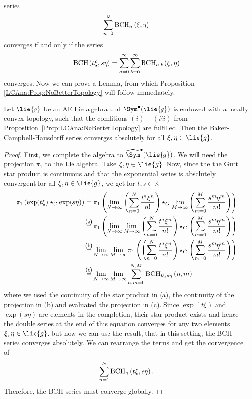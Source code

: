 series
\begin{equation*}
	\sum\limits_{n = 0}^N
	\mathrm{BCH}_{n}\left(\xi, \eta\right)
\end{equation*}
converges if and only if the series
\begin{equation*}
	\mathrm{BCH}\left(t \xi, s \eta\right)
	=
	\sum\limits_{a = 0}^{\infty}
	\sum\limits_{b = 0}^{\infty}
	\mathrm{BCH}_{a, b}\left(\xi, \eta\right)
\end{equation*}
converges. Now we can prove a Lemma, from which Proposition 
\ref{LCAna:Prop:NoBetterTopology} will follow immediately.
\begin{lemma}
	Let $\lie{g}$ be an AE Lie algebra and $\Sym^{\bullet}(\lie{g})$ is 
	endowed with a locally convex topology, such that the conditions $(i) - 
	(iii)$ from Proposition~\ref{Prop:LCAna:NoBetterTopology} are fulfilled. 
	Then the Baker-Campbell-Hausdorff series converges absolutely for all 
	$\xi, \eta \in \lie{g}$.
\end{lemma}
\begin{proof}
	First, we complete the algebra to $\widehat{\Sym}^{\bullet}(\lie{g})$.
	We will need the projection $\pi_1$ to the Lie algebra. Take 
	$\xi, \eta \in 	\lie{g}$. Now, since the the Gutt star product is 
	continuous and that the exponential series is absolutely convergent for 
	all $\xi, \eta \in \lie{g}$, we get for $t, s \in \mathbb{K}$
	\begin{align*}
		\pi_1 \left( \exp(t \xi) \star_G \exp(s \eta) \right)
		& =
		\pi_1
		\left(
			\lim_{N \rightarrow \infty}
			\left(
				\sum\limits_{n=0}^N
				\frac{t^n \xi^n}{n!}
			\right)
			\star_G
			\lim_{M \rightarrow \infty}
			\left(
				\sum\limits_{m=0}^M
				\frac{s^m \eta^m}{m!}
			\right)
		\right)
		\\
		& \ot{(a)}{=}
		\pi_1
		\left(
			\lim_{N \rightarrow \infty}
			\lim_{M \rightarrow \infty}
			\left(
				\sum\limits_{n=0}^N
				\frac{t^n \xi^n}{n!}
			\right)
			\star_G
			\left(
				\sum\limits_{m=0}^M
				\frac{s^m \eta^m}{m!}
			\right)
		\right)
		\\
		& \ot{(b)}{=}
		\lim_{N \rightarrow \infty}
		\lim_{M \rightarrow \infty}
		\pi_1
		\left(	
			\left(
				\sum\limits_{n=0}^N
				\frac{t^n \xi^n}{n!}
			\right)
			\star_G
			\left(
				\sum\limits_{m=0}^M
				\frac{s^m \eta^m}{m!}
			\right)
		\right)
		\\
		& \ot{(c)}{=}
		\lim_{N \rightarrow \infty}
		\lim_{M \rightarrow \infty}
		\sum\limits_{n,m=0}^{N, M}
		\bchparts{t \xi}{s \eta}{n}{m}
	\end{align*}
	where we used the continuity of the star product in (a), the continuity of 
	the projection in (b) and evaluated the projection in (c). Since 
	$\exp(t \xi)$ and $\exp(s \eta)$ are elements in the completion, their 
	star product exists and hence the double series at the end of this 
	equation converges for any two elements $\xi, \eta \in \lie{g}$. but now 
	we can use the result, that in this setting, the BCH series converges 
	absolutely. We can rearrange the terms and get the convergence of
	\begin{equation*}
		\sum\limits_{n = 1}^N
		\mathrm{BCH}_{n}\left(t \xi, s \eta\right).
	\end{equation*}
	Therefore, the BCH series must converge globally.
\end{proof}
